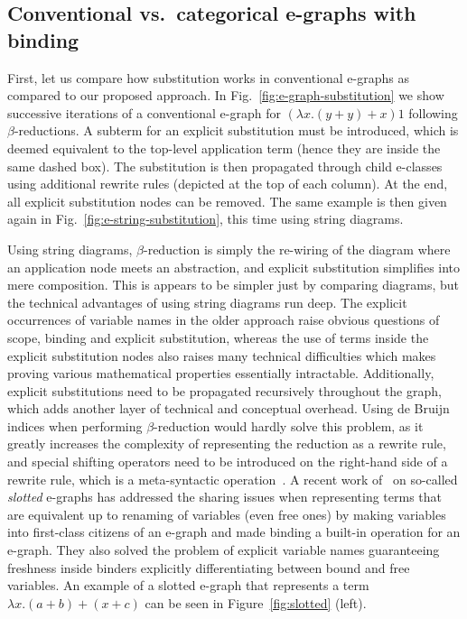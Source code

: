 \subsection{Conventional vs.\ categorical e-graphs with binding}%
\label{sec:vs-e-graphs-with-binding}

First, let us compare how substitution works in conventional e-graphs as compared to our proposed approach.
In Fig.~\ref{fig:e-graph-substitution} we show successive iterations of a conventional e-graph for $(\lambda x . (y + y) + x) 1$ following $\beta$-reductions.
A subterm for an explicit substitution must be introduced, which is deemed equivalent to the top-level application term (hence they are inside the same dashed box).
The substitution is then propagated through child e-classes using additional rewrite rules (depicted at the top of each column).
At the end, all explicit substitution nodes can be removed.
The same example is then given again in Fig.~\ref{fig:e-string-substitution}, this time using string diagrams.

Using string diagrams, $\beta$-reduction is simply the re-wiring of the diagram where an application node meets an abstraction, and explicit substitution simplifies into mere composition. 
This is appears to be simpler just by comparing diagrams, but the technical advantages of using string diagrams run deep.
The explicit occurrences of variable names in the older approach raise obvious questions of scope, binding and explicit substitution, whereas the use of terms inside the explicit substitution nodes also raises many technical difficulties which makes proving various mathematical properties essentially intractable.
Additionally, explicit substitutions need to be propagated recursively throughout the graph, which adds another layer of technical and conceptual overhead.
Using de Bruijn indices when performing $\beta$-reduction would hardly solve this problem, as it greatly increases the complexity of representing the reduction as a rewrite rule, and special shifting operators need to be introduced on the right-hand side of a rewrite rule, which is a meta-syntactic operation~\cite{koehler2022sketchguided}.
A recent work of~\cite{slotted-egraphs} on so-called \textit{slotted} e-graphs has addressed the sharing issues when representing terms that are equivalent up to renaming of variables (even free ones) by making variables into first-class citizens of an e-graph and made binding a built-in operation for an e-graph.
They also solved the problem of explicit variable names guaranteeing freshness inside binders explicitly differentiating between bound and free variables.
An example of a slotted e-graph that represents a term $\lambda x . (a + b) + (x + c)$ can be seen in Figure~\ref{fig:slotted} (left).

